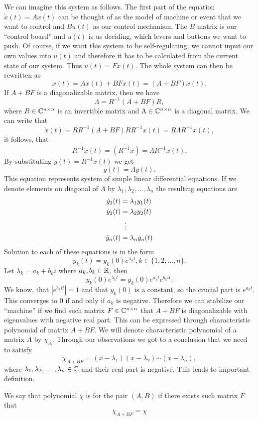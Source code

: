 We can imagine this system as follows. The first part of the equation $\dot{x}(t)=Ax(t)$ can be thought of as the model of machine or event that we want to control and $Bu(t)$ as our control mechanism. The $B$ matrix is our ``control board'' and $u(t)$ is us deciding, which levers and buttons we want to push. Of course, if we want this system to be self-regulating, we cannot input our own values into $u(t)$ and therefore it has to be calculated from the current state of our system. Thus $u(t)=Fx(t)$. The whole system can then be rewritten as $$\dot{x}(t)=Ax(t)+BFx(t)=(A+BF)x(t).$$ If $A+BF$ is a diagonalizable matrix, then we have $$\Lambda=R^{-1}(A+BF)R,$$ where $R \in \mathbb{C} ^{n \times n}$ is an invertible matrix and $\Lambda \in \mathbb{C} ^{n \times n}$ is a diagonal matrix. We can write that $$\dot{x}(t)=RR^{-1}(A+BF)RR^{-1}x(t)=R\Lambda R^{-1}x(t),$$ it follows, that $$R^{-1}\dot{x}(t)=\dot{(R^{-1}x)}=\Lambda R^{-1}x(t).$$ By substituting $y(t)=R^{-1}x(t)$ we get $$\dot{y}(t)=\Lambda y(t).$$ This equation represents system of simple linear differential equations. If we denote elements on diagonal of $\Lambda$ by $\lambda_1,\lambda_2,\ldots,\lambda_n$ the resulting equations are  
\begin{align*}
  \dot{y}_1(t)&=\lambda_1y_1(t) \\
  \dot{y}_2(t)&=\lambda_2y_2(t) \\
  &\vdotswithin{=} \\
  \dot{y}_n(t)&=\lambda_ny_n(t) 
\end{align*}
Solution to each of these equations is in the form 
$$y_k(t)=y_k(0)e^{\lambda_kt}, k\in\{1,2,\ldots,n\}.$$
Let $\lambda_k=a_k+b_ki$ where $a_k,b_k\in \mathbb{R}$, then 
$$y_k(0)e^{\lambda_kt}=y_k(0)e^{a_kt}e^{b_kit}.$$ 
We know, that $|e^{b_kit}|=1$ and that $y_k(0)$ is a constant, so the crucial part is $e^{a_kt}$. This converges to 0 if and only if $a_k$ is negative. Therefore we can stabilize our ``machine'' if we find such matrix $F \in \mathbb{C}^{n \times n}$ that $A+BF$ is diagonalizable with eigenvalues with negative real part. This can be expressed through characteristic polynomial of matrix $A+BF$. We will denote characteristic polynomial of a matrix $A$ by $\chi_A$. Through our observations we got to a conclusion that we need to satisfy $$\chi_{A+BF}=(x-\lambda_1)(x-\lambda_2)\cdots(x-\lambda_n),$$ where $\lambda_1,\lambda_2,\ldots,\lambda_n \in \mathbb{C}$ and their real part is negative. This leads to important definition.

\begin{definition}
	We say that polynomial $\chi$ is  for the pair $(A,B)$ if there exists such matrix $F$ that $$\chi_{A+BF}=\chi$$
\end{definition}

